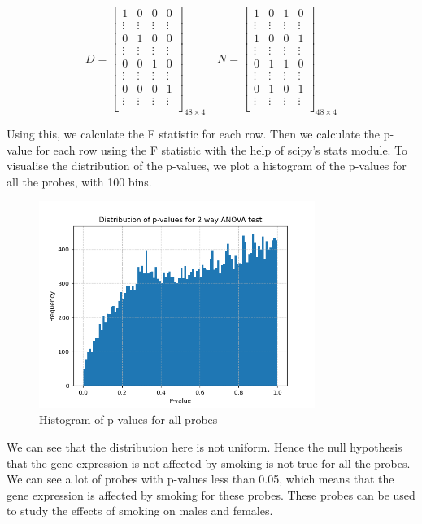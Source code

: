 \documentclass[12pt]{article}
\begin{document}
\[
D = \begin{bmatrix}
    1 & 0 & 0 & 0 \\
    \vdots & \vdots & \vdots & \vdots \\
    0 & 1 & 0 & 0 \\
    \vdots & \vdots & \vdots & \vdots \\
    0 & 0 & 1 & 0 \\
    \vdots & \vdots & \vdots & \vdots \\
    0 & 0 & 0 & 1 \\
    \vdots & \vdots & \vdots & \vdots \\
\end{bmatrix}_{48 \times 4} \quad
N = \begin{bmatrix}
    1 & 0 & 1 & 0 \\
    \vdots & \vdots & \vdots & \vdots \\
    1 & 0 & 0 & 1 \\
    \vdots & \vdots & \vdots & \vdots \\
    0 & 1 & 1 & 0 \\
    \vdots & \vdots & \vdots & \vdots \\
    0 & 1 & 0 & 1 \\
    \vdots & \vdots & \vdots & \vdots \\
\end{bmatrix}_{48 \times 4}
\]

Using this, we calculate the F statistic for each row. Then we calculate the p-value for each row using the F statistic with the help of scipy's stats module. To visualise the distribution of the p-values, we plot a histogram of the p-values for all the probes, with 100 bins.

\begin{figure}[h]
    \centering
    \includegraphics[width=0.8\textwidth]{output/p_values.png}
    \caption{Histogram of p-values for all probes}
\end{figure}

We can see that the distribution here is not uniform. Hence the null hypothesis that the gene expression is not affected by smoking is not true for all the probes. We can see a lot of probes with p-values less than 0.05, which means that the gene expression is affected by smoking for these probes. These probes can be used to study the effects of smoking on males and females.
\end{document}
